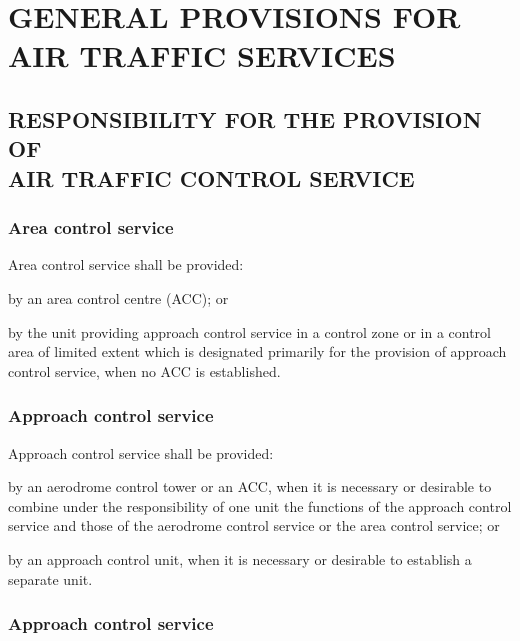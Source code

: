 \chapterbegin

\section[General Provisions for Air Traffic Services]{GENERAL PROVISIONS FOR AIR TRAFFIC SERVICES} \label{4}

\subsection[Responsibility for the provision of air traffic control service]{RESPONSIBILITY FOR THE PROVISION OF \\ AIR TRAFFIC CONTROL SERVICE}

\subsubsection{Area control service}

Area control service shall be provided:
\begin{enumalph}
    \item by an area control centre (ACC); or
    \item by the unit providing approach control service in a control zone or in a control area of limited extent which is designated primarily for the provision of approach control service, when no ACC is established.
\end{enumalph}

\subsubsection{Approach control service}

Approach control service shall be provided:
\begin{enumalph}
    \item by an aerodrome control tower or an ACC, when it is necessary or desirable to combine under the responsibility of one unit the functions of the approach control service and those of the aerodrome control service or the area control service; or
    \item by an approach control unit, when it is necessary or desirable to establish a separate unit.
\end{enumalph}


\subsubsection{Approach control service}

